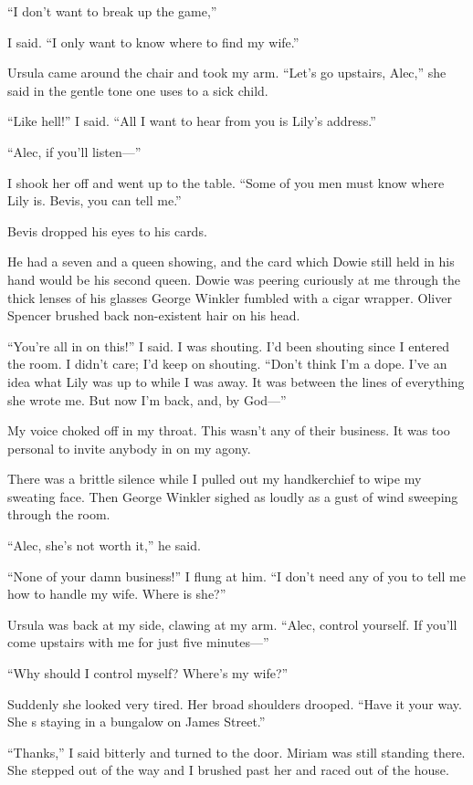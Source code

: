 \documentclass{novel}
\begin{document}
“I don’t want to break up the game,”

I said. “I only want to know where to find my wife.”

Ursula came around the chair and took my arm. “Let’s go upstairs, Alec,” she said in the gentle tone one uses to a sick child.

“Like hell!” I said. “All I want to hear from you is Lily’s address.”

“Alec, if you’ll listen—”

I shook her off and went up to the table. “Some of you men must know where Lily is. Bevis, you can tell me.”

Bevis dropped his eyes to his cards.

He had a seven and a queen showing, and the card which Dowie still held in his hand would be his second queen. Dowie was peering curiously at me through the thick lenses of his glasses George Winkler fumbled with a cigar wrapper. Oliver Spencer brushed back non-existent hair on his head.

“You’re all in on this!” I said. I was shouting. I’d been shouting since I entered the room. I didn’t care; I’d keep on shouting. “Don’t think I’m a dope. I’ve an idea what Lily was up to while I was away. It was between the lines of everything she wrote me. But now I’m back, and, by God—”

My voice choked off in my throat. This wasn’t any of their business. It was too personal to invite anybody in on my agony.

There was a brittle silence while I pulled out my handkerchief to wipe my sweating face. Then George Winkler sighed as loudly as a gust of wind sweeping through the room.

“Alec, she’s not worth it,” he said.

“None of your damn business!” I flung at him. “I don’t need any of you to tell me how to handle my wife. Where is she?”

Ursula was back at my side, clawing at my arm. “Alec, control yourself. If you’ll come upstairs with me for just five minutes—”

“Why should I control myself? Where’s my wife?”

Suddenly she looked very tired. Her broad shoulders drooped. “Have it your way. She s staying in a bungalow on James Street.”

“Thanks,” I said bitterly and turned to the door. Miriam was still standing there. She stepped out of the way and I brushed past her and raced out of the house.
\end{document}
